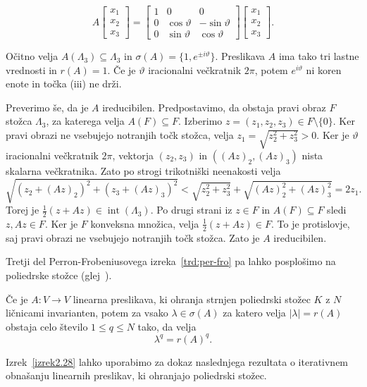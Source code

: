 \documentclass[mat2, tisk]{fmfdelo}
\begin{document}
\[
A \begin{bmatrix}
x_{1} \\
x_{2} \\
x_{3}
\end{bmatrix}
=
\begin{bmatrix}
1 & 0 & 0 \\
0 & \cos\vartheta & -\sin\vartheta \\
0 & \sin\vartheta & \cos\vartheta
\end{bmatrix}
\begin{bmatrix}
x_{1} \\
x_{2} \\
x_{3}
\end{bmatrix}.
\]

Očitno velja $A(\Lambda_{3}) \subseteq \Lambda_{3}$ in $\sigma(A)=\{1, e^{\pm i\vartheta}\}$.
Preslikava $A$ ima tako tri lastne vrednosti in $r(A) = 1$.  Če je $\vartheta$ iracionalni 
večkratnik $2\pi$, potem $e^{i\vartheta}$ ni koren enote in točka (iii) ne drži.

Preverimo še, da je $A$ ireducibilen. Predpostavimo, da obstaja
pravi obraz $F$ stožca $\Lambda_3$, za katerega velja
$A(F)\subseteq F$. Izberimo $z=(z_1,z_2,z_3)\in F\setminus\{0\}$.
Ker pravi obrazi ne vsebujejo notranjih točk stožca, velja
$z_1=\sqrt{z_2^2+z_3^2}>0$.
Ker je $\vartheta$ iracionalni večkratnik $2\pi$, vektorja
$(z_2,z_3)$ in $((Az)_2,(Az)_3)$ nista skalarna večkratnika.
Zato po strogi trikotniški neenakosti velja
\[
\sqrt{(z_2+(Az)_2)^2+(z_3+(Az)_3)^2}
<\sqrt{z_2^2+z_3^2}+\sqrt{(Az)_2^2+(Az)_3^2}
=2z_1.
\]
Torej je $\frac12(z+Az)\in\operatorname{int}(\Lambda_3)$.
Po drugi strani iz $z\in F$ in $A(F)\subseteq F$ sledi
$z,Az\in F$. Ker je $F$ konveksna množica, velja
$\frac12(z+Az)\in F$. To je protislovje, saj pravi obrazi
ne vsebujejo notranjih točk stožca. Zato je $A$ ireducibilen.

Tretji del Perron-Frobeniusovega izreka~\ref{trd:per-fro} pa lahko posplošimo na poliedrske
stožce (glej~\cite{KreinRuthman}).

\begin{izrek}\label{izrek2.28}
Če je $A : V \to V$ linearna preslikava, ki ohranja strnjen poliedrski
stožec $K$ z $N$ ličnicami invarianten, potem za vsako $\lambda \in \sigma(A)$ za katero velja
$|\lambda| = r(A)$ obstaja celo število $1 \le q \le N$ tako, da velja
\[
\lambda^{q} = {r(A)}^{q}.
\]


\end{izrek}

Izrek~\ref{izrek2.28} lahko uporabimo za dokaz naslednjega rezultata o iterativnem
obnašanju linearnih preslikav, ki ohranjajo poliedrski stožec.
\end{document}
